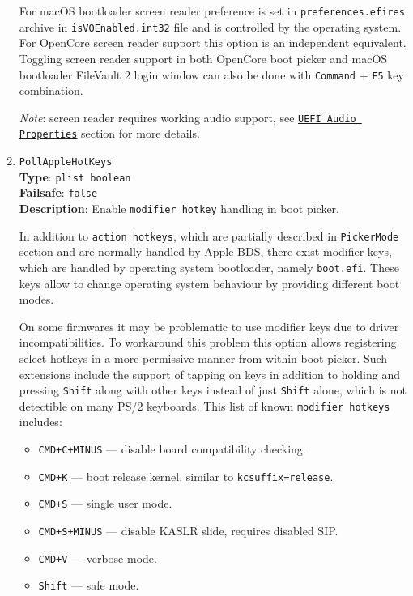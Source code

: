 \documentclass[]{article}
\providecommand{\tightlist}{%
  \setlength{\itemsep}{0pt}\setlength{\parskip}{0pt}}
\begin{document}
\begin{enumerate}
  For macOS bootloader screen reader preference is set in \texttt{preferences.efires}
  archive in \texttt{isVOEnabled.int32} file and is controlled by the operating system.
  For OpenCore screen reader support this option is an independent equivalent.
  Toggling screen reader support in both OpenCore boot picker and macOS bootloader
  FileVault 2 login window can also be done with \texttt{Command} + \texttt{F5} key
  combination.

  \emph{Note}: screen reader requires working audio support, see
  \hyperref[uefiaudioprops]{\texttt{UEFI Audio Properties}}
  section for more details.

\item
  \texttt{PollAppleHotKeys}\\
  \textbf{Type}: \texttt{plist\ boolean}\\
  \textbf{Failsafe}: \texttt{false}\\
  \textbf{Description}: Enable \texttt{modifier hotkey} handling in boot picker.

  In addition to \texttt{action hotkeys}, which are partially described in \texttt{PickerMode}
  section and are normally handled by Apple BDS, there exist modifier keys, which are
  handled by operating system bootloader, namely \texttt{boot.efi}. These keys
  allow to change operating system behaviour by providing different boot modes.

  On some firmwares it may be problematic to use modifier keys due to driver incompatibilities.
  To workaround this problem this option allows registering select hotkeys in a more
  permissive manner from within boot picker. Such extensions include the support
  of tapping on keys in addition to holding and pressing \texttt{Shift} along with
  other keys instead of just \texttt{Shift} alone, which is not detectible on many
  PS/2 keyboards. This list of known \texttt{modifier hotkeys} includes:
  \begin{itemize}
  \tightlist
  \item \texttt{CMD+C+MINUS} --- disable board compatibility checking.
  \item \texttt{CMD+K} --- boot release kernel, similar to \texttt{kcsuffix=release}.
  \item \texttt{CMD+S} --- single user mode.
  \item \texttt{CMD+S+MINUS} --- disable KASLR slide, requires disabled SIP.
  \item \texttt{CMD+V} --- verbose mode.
  \item \texttt{Shift} --- safe mode.
  \end{itemize}


\end{enumerate}
\end{document}
